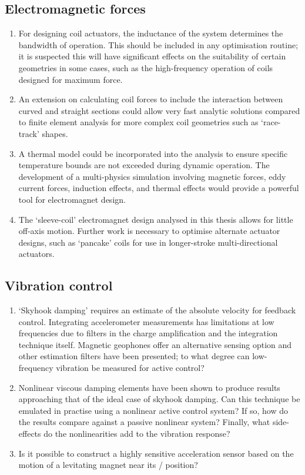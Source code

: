 \documentclass[11pt,a4paper]{memoir}
\begin{document}
\subsection{Electromagnetic forces}

\begin{enumerate}
\item For designing coil actuators, the inductance of the system determines the bandwidth of operation.
This should be included in any optimisation routine; it is suspected this will have significant effects on the suitability of certain geometries in some cases, such as the high-frequency operation of coils designed for maximum force.

\item An extension on calculating coil forces to include the interaction between curved and straight sections could allow very fast analytic solutions compared to finite element analysis for more complex coil geometries such as `race-track' shapes.

\item A thermal model could be incorporated into the analysis to ensure specific temperature bounds are not exceeded during dynamic operation.
The development of a multi-physics simulation involving magnetic forces, eddy current forces, induction effects, and thermal effects would provide a powerful tool for electromagnet design.

\item The `sleeve-coil' electromagnet design analysed in this thesis allows for little off-axis motion.
Further work is necessary to optimise alternate actuator designs, such as `pancake' coils for use in longer-stroke multi-directional actuators.
\end{enumerate}

\subsection{Vibration control}

\begin{enumerate}
\item
`Skyhook damping' requires an estimate of the absolute velocity for feedback control.
Integrating accelerometer measurements has limitations at low frequencies due to filters in the charge amplification and the integration technique itself.
Magnetic geophones offer an alternative sensing option and other estimation filters have been presented; to what degree can low-frequency vibration be measured for active control?

\item
Nonlinear viscous damping elements have been shown to produce results approaching that of the ideal case of skyhook damping.
Can this technique be emulated in practise using a nonlinear active control system?
If so, how do the results compare against a passive nonlinear system?
Finally, what side-effects do the nonlinearities add to the vibration response?

\item
Is it possible to construct a highly sensitive acceleration sensor based on the motion of a levitating magnet near its \qzs/ position?
\end{enumerate}
\end{document}
